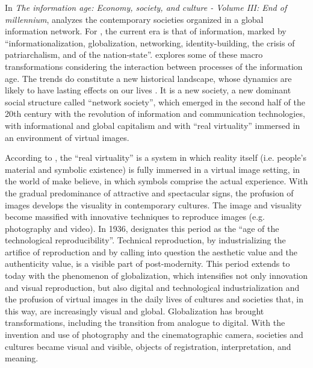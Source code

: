 \documentclass[english]{textolivre}
\begin{document}
In \textit{The information age: Economy, society, and culture - Volume III: End of millennium}, \textcite{castells_information_2010} analyzes the contemporary societies organized in a global information network. For \textcite[p.~2]{castells_information_2010}, the current era is that of information, marked by “informationalization, globalization, networking, identity-building, the crisis of patriarchalism, and of the nation-state”. \textcite{castells_information_2010} explores some of these macro transformations considering the interaction between processes of the information age. The trends do constitute a new historical landscape, whose dynamics are likely to have lasting effects on our lives \cite[p.~2]{castells_information_2010}. It is a new society, a new dominant social structure called “network society”, which emerged in the second half of the 20th century with the revolution of information and communication technologies, with informational and global capitalism and with “real virtuality” immersed in an environment of virtual images.

According to \textcite[p.~386]{castells_information_2010}, the “real virtuality” is a system in which reality itself (i.e. people’s material and symbolic existence) is fully immersed in a virtual image setting, in the world of make believe, in which symbols comprise the actual experience. With the gradual predominance of attractive and spectacular signs, the profusion of images develops the visuality in contemporary cultures. The image and visuality become massified with innovative techniques to reproduce images (e.g. photography and video). In 1936, \textcite[p.~104]{benjamin_work_2002} designates this period as the “age of the technological reproducibility”. Technical reproduction, by industrializing the artifice of reproduction and by calling into question the aesthetic value and the authenticity value, is a visible part of post-modernity. This period extends to today with the phenomenon of globalization, which intensifies not only innovation and visual reproduction, but also digital and technological industrialization and the profusion of virtual images in the daily lives of cultures and societies that, in this way, are increasingly visual and global. Globalization has brought transformations, including the transition from analogue to digital. With the invention and use of photography and the cinematographic camera, societies and cultures became visual and visible, objects of registration, interpretation, and meaning.
\end{document}
